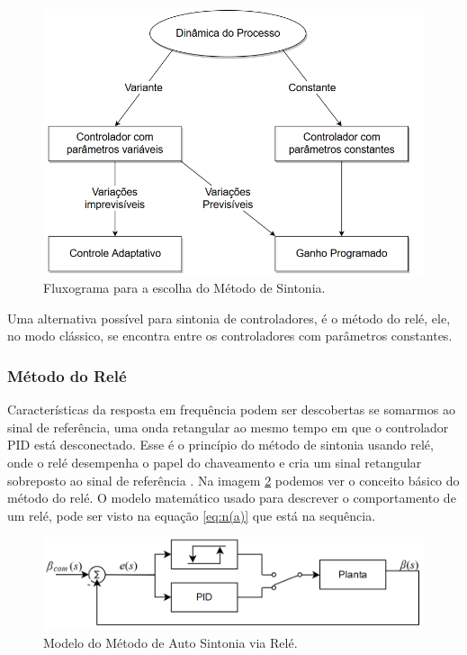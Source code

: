 \begin{figure}[H]
  \caption{Fluxograma para a escolha do Método de Sintonia.}
  \begin{center}
      \includegraphics[scale=0.55]{referencial/img/escolha_controle_astrom_p236}
  \end{center}
  \label{fig:escolha_controle_astrom_p236}
\end{figure}

Uma alternativa possível para sintonia de controladores, é o método do relé, ele, no modo clássico, se encontra entre os controladores com parâmetros constantes.



\subsubsection{Método do Relé}

Características da resposta em frequência podem ser descobertas se somarmos ao sinal de referência, uma onda retangular ao mesmo tempo em que o controlador PID está desconectado. Esse é o princípio do método de sintonia usando relé, onde o relé desempenha o papel do chaveamento e cria um sinal retangular sobreposto ao sinal de referência \cite{Levine1996}. Na imagem \ref{fig:pid_autotuning_relay_astrom_p239} podemos ver o conceito básico do método do relé. O modelo matemático usado para descrever o comportamento de um relé, pode ser visto na equação \ref{eq:n(a)} que está na sequência.
 
\begin{figure}[H]
  \caption{Modelo do Método de Auto Sintonia via Relé.}
  \begin{center}
      \includegraphics[scale=0.55]{referencial/img/pid_autotuning_relay_astrom_p239}
  \end{center}
  \label{fig:pid_autotuning_relay_astrom_p239}
\end{figure}

